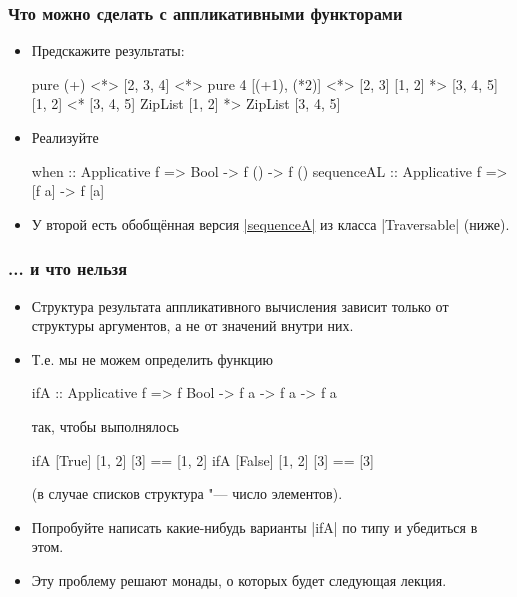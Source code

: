 \documentclass[11pt]{beamer}
\begin{document}
\begin{frame}[fragile]
  \frametitle{Что можно сделать с аппликативными функторами}
  \begin{itemize}
    \item Предскажите результаты:
          \begin{haskell}
            pure (+) <*> [2, 3, 4] <*> pure 4
            [(+1), (*2)] <*> [2, 3]
            [1, 2] *> [3, 4, 5]
            [1, 2] <* [3, 4, 5]
            ZipList [1, 2] *> ZipList [3, 4, 5]
          \end{haskell}
          \pause
    \item Реализуйте
          \begin{haskell}
            when :: Applicative f => Bool -> f () -> f ()    
            sequenceAL :: Applicative f => [f a] -> f [a]
          \end{haskell}
    \item У второй есть обобщённая версия \href{http://hackage.haskell.org/package/base/docs/Data-Traversable.html#v:sequenceA}{\haskinline|sequenceA|} из класса \haskinline|Traversable| (ниже).
  \end{itemize}
\end{frame}

\begin{frame}[fragile]
  \frametitle{... и что нельзя}
  \begin{itemize}
    \item Структура результата аппликативного вычисления зависит только от структуры аргументов, а не от значений внутри них.
    \item Т.е. мы не можем определить функцию
          \begin{haskell}
            ifA :: Applicative f => f Bool ->
              f a -> f a -> f a
          \end{haskell}
          так, чтобы выполнялось
          \begin{haskell}
            ifA [True]  [1, 2] [3] == [1, 2]
            ifA [False] [1, 2] [3] == [3]
          \end{haskell}
          (в случае списков структура "--- число элементов).
          \pause
    \item Попробуйте написать какие-нибудь варианты \haskinline|ifA| по типу и убедиться в этом.
          \pause
    \item Эту проблему решают монады, о которых будет следующая лекция.
  \end{itemize}
\end{frame}
\end{document}
